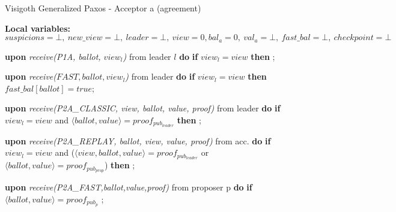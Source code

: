 \begin{algorithm} 
	\caption{Visigoth Generalized Paxos - Acceptor a (agreement)}
	\label{VFT-Acc}
	\textbf{Local variables:} $suspicions = \bot,\ new\_view = \bot,\ leader = \bot,\ view = 0, bal_a = 0,\ val_a = \bot,\ fast\_bal = \bot,\ checkpoint=\bot$
	\begin{algorithmic}[1]
		\State \textbf{upon} \textit{receive(P1A, ballot, $view_l$)} from leader $l$ \textbf{do}
		\State \hspace{\algorithmicindent} \textbf{if} $view_l = view$ \textbf{then}
		\State \hspace{\algorithmicindent}\hspace{\algorithmicindent} ;
		
		\State
		\State \textbf{upon} \textit{receive($FAST,ballot,view_l$)} from leader \textbf{do}
		\State \hspace{\algorithmicindent} \textbf{if} $view_l = view$ \textbf{then}
		\State \hspace{\algorithmicindent}\hspace{\algorithmicindent} $fast\_bal[ballot] = true$;
		
		\State
		\State \textbf{upon} \textit{receive(P2A\_CLASSIC, view, ballot, value, proof)} from leader \textbf{do}
		\State \hspace{\algorithmicindent} \textbf{if} $view_l = view$ and $\langle ballot, value \rangle = proof_{pub_{leader}}$ \textbf{then}
		\State \hspace{\algorithmicindent}\hspace{\algorithmicindent} ; 
		
		\State
		\State \textbf{upon} \textit{receive(P2A\_REPLAY, ballot, view, value, proof)} from acc. \textbf{do}
		\State \hspace{\algorithmicindent} \textbf{if} $view_l = view$ and ($\langle view, ballot, value \rangle = proof_{pub_{leader}}$ or $\langle ballot, value \rangle = proof_{pub_{prop}}$) \textbf{then}
		\State \hspace{\algorithmicindent}\hspace{\algorithmicindent} ; 

		\State		
		\State \textbf{upon} \textit{receive(P2A\_FAST,ballot,value,proof)} from proposer p \textbf{do}
		\State \hspace{\algorithmicindent} \textbf{if} $\langle ballot, value \rangle = proof_{pub_p}$
		\State \hspace{\algorithmicindent}\hspace{\algorithmicindent} ;


\end{algorithmic}
\end{algorithm}
